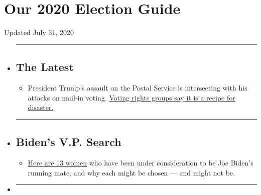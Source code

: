 \hypertarget{our-2020-election-guide}{%
\section{Our 2020 Election Guide}\label{our-2020-election-guide}}

Updated July 31, 2020

\begin{itemize}
\item
  \begin{center}\rule{0.5\linewidth}{\linethickness}\end{center}

  \hypertarget{the-latest}{%
  \subsection{The Latest}\label{the-latest}}

  \begin{itemize}
  \tightlist
  \item
    President Trump's assault on the Postal Service is intersecting with
    his attacks on mail-in voting.
    \href{https://www.nytimes.com/2020/07/31/us/politics/trump-usps-mail-delays.html?action=click\&pgtype=Article\&state=default\&region=BELOW_MAIN_CONTENT\&context=storylines_guide}{Voting
    rights groups say it is a recipe for disaster.}
  \end{itemize}
\item
  \begin{center}\rule{0.5\linewidth}{\linethickness}\end{center}

  \hypertarget{bidens-vp-search}{%
  \subsection{Biden's V.P. Search}\label{bidens-vp-search}}

  \begin{itemize}
  \tightlist
  \item
    \href{https://www.nytimes.com/article/biden-vice-president-2020.html?action=click\&pgtype=Article\&state=default\&region=BELOW_MAIN_CONTENT\&context=storylines_guide}{Here
    are 13 women} who have been under consideration to be Joe Biden's
    running mate, and why each might be chosen --- and might not be.
  \end{itemize}
\item
  \begin{center}\rule{0.5\linewidth}{\linethickness}\end{center}


\end{itemize}

